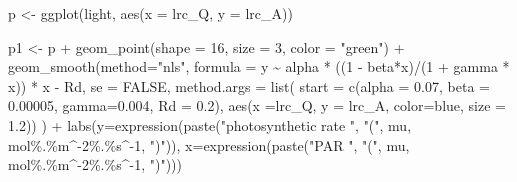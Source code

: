 \documentclass[
]{krantz}
\makeatletter
\newenvironment{Shaded}{\begin{snugshade}}{\end{snugshade}}
\newcommand{\AttributeTok}[1]{\textcolor[rgb]{0.77,0.63,0.00}{#1}}
\newcommand{\ConstantTok}[1]{\textcolor[rgb]{0.00,0.00,0.00}{#1}}
\newcommand{\DecValTok}[1]{\textcolor[rgb]{0.00,0.00,0.81}{#1}}
\newcommand{\FloatTok}[1]{\textcolor[rgb]{0.00,0.00,0.81}{#1}}
\newcommand{\FunctionTok}[1]{\textcolor[rgb]{0.00,0.00,0.00}{#1}}
\newcommand{\NormalTok}[1]{#1}
\newcommand{\OtherTok}[1]{\textcolor[rgb]{0.56,0.35,0.01}{#1}}
\newcommand{\SpecialCharTok}[1]{\textcolor[rgb]{0.00,0.00,0.00}{#1}}
\newcommand{\StringTok}[1]{\textcolor[rgb]{0.31,0.60,0.02}{#1}}
\newenvironment{kframe}{%
\medskip{}
\setlength{\fboxsep}{.8em}
 \def\at@end@of@kframe{}%
 \ifinner\ifhmode%
  \def\at@end@of@kframe{\end{minipage}}%
  \begin{minipage}{\columnwidth}%
 \fi\fi%
 \def\FrameCommand##1{\hskip\@totalleftmargin \hskip-\fboxsep
 \colorbox{shadecolor}{##1}\hskip-\fboxsep
     \hskip-\linewidth \hskip-\@totalleftmargin \hskip\columnwidth}%
 \MakeFramed {\advance\hsize-\width
   \@totalleftmargin\z@ \linewidth\hsize
   \@setminipage}}%
 {\par\unskip\endMakeFramed%
 \at@end@of@kframe}
\renewenvironment{Shaded}{\begin{kframe}}{\end{kframe}}
\makeatother
\begin{document}
\begin{Shaded}
\begin{Highlighting}[]
\NormalTok{p }\OtherTok{\textless{}{-}} \FunctionTok{ggplot}\NormalTok{(light, }\FunctionTok{aes}\NormalTok{(}\AttributeTok{x =}\NormalTok{ lrc\_Q, }\AttributeTok{y =}\NormalTok{ lrc\_A))}

\NormalTok{p1 }\OtherTok{\textless{}{-}}\NormalTok{ p }\SpecialCharTok{+} 
  \FunctionTok{geom\_point}\NormalTok{(}\AttributeTok{shape =} \DecValTok{16}\NormalTok{, }\AttributeTok{size =} \DecValTok{3}\NormalTok{, }\AttributeTok{color =} \StringTok{"green"}\NormalTok{) }\SpecialCharTok{+} 
  \FunctionTok{geom\_smooth}\NormalTok{(}\AttributeTok{method=}\StringTok{"nls"}\NormalTok{, }\AttributeTok{formula =} 
\NormalTok{   y }\SpecialCharTok{\textasciitilde{}}\NormalTok{ alpha }\SpecialCharTok{*}\NormalTok{ ((}\DecValTok{1} \SpecialCharTok{{-}} 
\NormalTok{              beta}\SpecialCharTok{*}\NormalTok{x)}\SpecialCharTok{/}\NormalTok{(}\DecValTok{1} \SpecialCharTok{+}\NormalTok{ gamma }\SpecialCharTok{*}\NormalTok{ x)) }\SpecialCharTok{*}\NormalTok{ x }\SpecialCharTok{{-}}\NormalTok{ Rd, }
    \AttributeTok{se =} \ConstantTok{FALSE}\NormalTok{, }\AttributeTok{method.args =} \FunctionTok{list}\NormalTok{(}
    \AttributeTok{start =} \FunctionTok{c}\NormalTok{(}\AttributeTok{alpha =} \FloatTok{0.07}\NormalTok{, }\AttributeTok{beta =} \FloatTok{0.00005}\NormalTok{,}
              \AttributeTok{gamma=}\FloatTok{0.004}\NormalTok{, }\AttributeTok{Rd =} \FloatTok{0.2}\NormalTok{), }
    \FunctionTok{aes}\NormalTok{(}\AttributeTok{x =}\NormalTok{lrc\_Q, }\AttributeTok{y =}\NormalTok{ lrc\_A, }
    \AttributeTok{color=}\StringTok{\textquotesingle{}blue\textquotesingle{}}\NormalTok{, }\AttributeTok{size =} \FloatTok{1.2}\NormalTok{))}
\NormalTok{  ) }\SpecialCharTok{+}
  \FunctionTok{labs}\NormalTok{(}\AttributeTok{y=}\FunctionTok{expression}\NormalTok{(}\FunctionTok{paste}\NormalTok{(}\StringTok{"photosynthetic rate  "}\NormalTok{, }
          \StringTok{"("}\NormalTok{, mu, mol}\SpecialCharTok{\%.\%}\NormalTok{m}\SpecialCharTok{\^{}{-}}\DecValTok{2}\SpecialCharTok{\%.\%}\NormalTok{s}\SpecialCharTok{\^{}{-}}\DecValTok{1}\NormalTok{, }\StringTok{")"}\NormalTok{)), }
       \AttributeTok{x=}\FunctionTok{expression}\NormalTok{(}\FunctionTok{paste}\NormalTok{(}\StringTok{"PAR "}\NormalTok{, }
           \StringTok{"("}\NormalTok{, mu, mol}\SpecialCharTok{\%.\%}\NormalTok{m}\SpecialCharTok{\^{}{-}}\DecValTok{2}\SpecialCharTok{\%.\%}\NormalTok{s}\SpecialCharTok{\^{}{-}}\DecValTok{1}\NormalTok{, }\StringTok{")"}\NormalTok{)))}



\end{Highlighting}
\end{Shaded}
\end{document}
